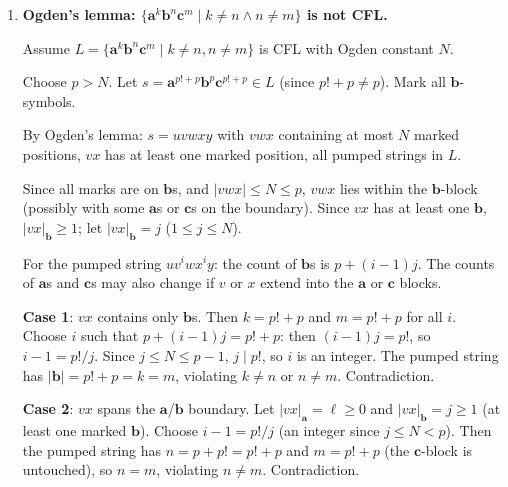 \begin{enumerate}[{10.}1. ]
\begin{enumerate}
\item Define $h: \{\pmb{a},\pmb{b},\pmb{c}\}^* \to \{\pmb{a},\pmb{b}\}^*$ by $h(\pmb{a})=\pmb{a}$, $h(\pmb{b})=\pmb{b}$, $h(\pmb{c})=\pmb{a}$. Then:
$h(\{\pmb{c}^n\pmb{b}^m\mid n=m\}) = \{\pmb{a}^n\pmb{b}^n\mid n\geq 1\}$ and $h(\{\pmb{a}^n\pmb{b}^m\mid n=2m\}) = \{\pmb{a}^n\pmb{b}^m\mid n=2m\}$.
$h(L) = \{\pmb{a}^n\pmb{b}^n\}\cup\{\pmb{a}^n\pmb{b}^m\mid n=2m\}$. The discussion immediately before Theorem 10.9 identifies this union as a context-free language that is \emph{not} deterministic context free. Hence this homomorphism takes a DCFL to a non-DCFL, as required.
\end{enumerate}

\item \textbf{Ogden's lemma: $\{\pmb{a}^k\pmb{b}^n\pmb{c}^m \mid k\neq n \wedge n\neq m\}$ is not CFL.}

Assume $L = \{\pmb{a}^k\pmb{b}^n\pmb{c}^m \mid k\neq n, n\neq m\}$ is CFL with Ogden constant $N$.

Choose $p > N$. Let $s = \pmb{a}^{p!+p}\pmb{b}^p\pmb{c}^{p!+p} \in L$ (since $p!+p \neq p$). Mark all $\pmb{b}$-symbols.

By Ogden's lemma: $s = uvwxy$ with $vwx$ containing at most $N$ marked positions, $vx$ has at least one marked position, all pumped strings in $L$.

Since all marks are on $\pmb{b}$s, and $|vwx|\leq N \leq p$, $vwx$ lies within the $\pmb{b}$-block (possibly with some $\pmb{a}$s or $\pmb{c}$s on the boundary). Since $vx$ has at least one $\pmb{b}$, $|vx|_{\pmb{b}} \geq 1$; let $|vx|_{\pmb{b}} = j$ ($1\leq j\leq N$).

For the pumped string $uv^i wx^i y$: the count of $\pmb{b}$s is $p + (i-1)j$. The counts of $\pmb{a}$s and $\pmb{c}$s may also change if $v$ or $x$ extend into the $\pmb{a}$ or $\pmb{c}$ blocks.

\textbf{Case 1}: $vx$ contains only $\pmb{b}$s. Then $k = p!+p$ and $m = p!+p$ for all $i$. Choose $i$ such that $p + (i-1)j = p!+p$: then $(i-1)j = p!$, so $i-1 = p!/j$. Since $j\leq N\leq p-1$, $j\mid p!$, so $i$ is an integer. The pumped string has $|\pmb{b}|=p!+p=k=m$, violating $k\neq n$ or $n\neq m$. Contradiction.

\textbf{Case 2}: $vx$ spans the $\pmb{a}$/$\pmb{b}$ boundary. Let $|vx|_{\pmb{a}}=\ell \geq 0$ and $|vx|_{\pmb{b}}=j \geq 1$ (at least one marked $\pmb{b}$). Choose $i - 1 = p!/j$ (an integer since $j \leq N < p$). Then the pumped string has $n = p + p! = p!+p$ and $m = p!+p$ (the $\pmb{c}$-block is untouched), so $n = m$, violating $n\neq m$. Contradiction.


\end{enumerate}
